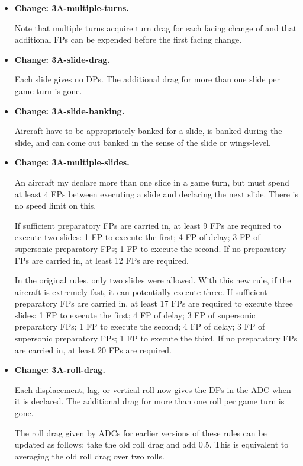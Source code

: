 \documentclass{report}
\newcommand{\changetag}[1]{\textbf{Change: #1.}\par}
\begin{document}
\begin{itemize}
    \item\changetag{3A-multiple-turns}

        Note that multiple turns acquire turn drag for each facing change of  and that additional FPs can be expended before the first facing change.

    \item\changetag{3A-slide-drag}

        Each slide gives no DPs.  The additional drag for more than one slide per game turn is gone.

    \item\changetag{3A-slide-banking}

        Aircraft have to be appropriately banked for a slide, is banked during the slide, and can come out banked in the sense of the slide or wings-level.

    \item\changetag{3A-multiple-slides}

        An aircraft my declare more than one slide in a game turn, but must spend at least 4 FPs between executing a slide and declaring the next slide. There is no speed limit on this.

        If sufficient preparatory FPs are carried in, at least 9 FPs are required to execute two slides: 1 FP to execute the first; 4 FP of delay; 3 FP of supersonic preparatory FPs; 1 FP to execute the second. If no preparatory FPs are carried in, at least 12 FPs are required.

        In the original rules, only two slides were allowed. With this new rule, if the aircraft is extremely fast, it can potentially execute three. If sufficient preparatory FPs are carried in, at least 17 FPs are required to execute three slides: 1 FP to execute the first; 4 FP of delay; 3 FP of supersonic preparatory FPs; 1 FP to execute the second; 4 FP of delay; 3 FP of supersonic preparatory FPs; 1 FP to execute the third. If no preparatory FPs are carried in, at least 20 FPs are required.

    \item\changetag{3A-roll-drag}

        Each displacement, lag, or vertical roll now gives the DPs in the ADC when it is declared. The additional drag for more than one roll per game turn is gone.

        The roll drag given by ADCs for earlier versions of these rules can be updated as follows: take the old roll drag and add 0.5. This is equivalent to averaging the old roll drag over two rolls.


\end{itemize}
\end{document}
